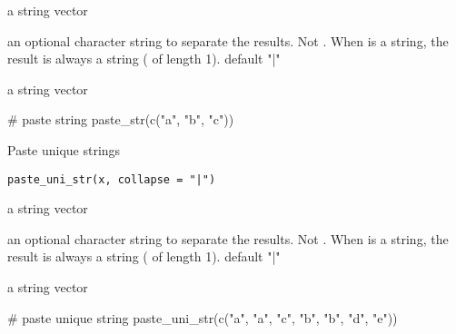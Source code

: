 \documentclass[letterpaper]{book}
\begin{document}
%
\begin{Arguments}
\begin{ldescription}
\item[\code{x}] a string vector

\item[\code{collapse}] an optional character string to separate the results. Not
. When  is a string, the result is always a string
( of length 1). default "|"
\end{ldescription}
\end{Arguments}
%
\begin{Value}
a string vector
\end{Value}
%
\begin{Examples}
\begin{ExampleCode}
# paste string
paste_str(c("a", "b", "c"))

\end{ExampleCode}
\end{Examples}
%
\begin{Description}
Paste unique strings
\end{Description}
%
\begin{Usage}
\begin{verbatim}
paste_uni_str(x, collapse = "|")
\end{verbatim}
\end{Usage}
%
\begin{Arguments}
\begin{ldescription}
\item[\code{x}] a string vector

\item[\code{collapse}] an optional character string to separate the results. Not
. When  is a string, the result is always a string
( of length 1). default "|"
\end{ldescription}
\end{Arguments}
%
\begin{Value}
a string vector
\end{Value}
%
\begin{Examples}
\begin{ExampleCode}
# paste unique string
paste_uni_str(c("a", "a", "c", "b", "b", "d", "e"))

\end{ExampleCode}
\end{Examples}
\end{document}
